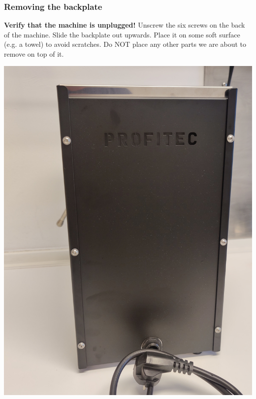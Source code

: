 \documentclass[]{article}
\begin{document}
\subsubsection{Removing the backplate}
\label{sec:backplate}
\begin{minipage}[t]{0.5\linewidth}
	\vspace{0pt}
	\textbf{Verify that the machine is unplugged!} Unscrew the six screws on the back of the machine. Slide the backplate out upwards. Place it on some soft surface (e.g. a towel) to avoid scratches. Do NOT place any other parts we are about to remove on top of it.
\end{minipage}
\hfill
\begin{minipage}[t]{0.4\linewidth}
	\vspace{0pt}
	\includegraphics[width=\linewidth]{images/03_installation/04_remove_screws_check_unplug.jpg}
\end{minipage}
\end{document}
